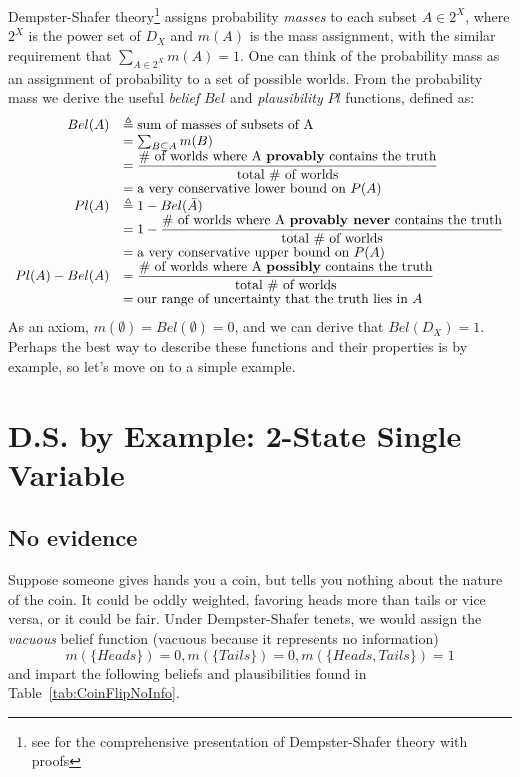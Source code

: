 \documentclass[letterpaper]{article}
\begin{document}
Dempster-Shafer theory\footnote{see \cite{Shafer1976} for the comprehensive presentation of Dempster-Shafer theory with proofs} assigns probability \textit{masses} to each subset $A \in 2^X$, where $2^X$ is the power set of $D_X$ and $m(A)$ is the mass assignment, with the similar requirement that $\sum_{A \in 2^{X}}m(A) = 1$.  One can think of the probability mass as an assignment of probability to a set of possible worlds.  
From the probability mass we derive the useful \textit{belief} $Bel$ and \textit{plausibility} $Pl$ functions, defined as:
\[
\begin{array}{rl}
Bel(A) & \triangleq \text{sum of masses of subsets of A}\\
	& = \sum_{B \subseteq A} m(B) \\
	& = \dfrac{\text{\# of worlds where A \textbf{provably} contains the truth}}{\text{total \# of worlds}}\\
	& = \text{a very conservative lower bound on } P(A)\\
Pl(A) & \triangleq 1-Bel(\bar{A})\\
	& = 1-\dfrac{\text{\# of worlds where A \textbf{provably never} contains the truth}}{\text{total \# of worlds}}\\
	& = \text{a very conservative upper bound on } P(A)\\
Pl(A)-Bel(A) & = \dfrac{\text{\# of worlds where A \textbf{possibly} contains the truth}}{\text{total \# of worlds}}\\
	& = \text{our range of uncertainty that the truth lies in } A
\end{array}
\]
As an axiom, $m(\emptyset)=Bel(\emptyset)=0$, and we can derive that $Bel(D_X)=1$.  Perhaps the best way to describe these functions and their properties is by example, so let's move on to a simple example.

\section{D.S. by Example: 2-State Single Variable}
\subsection{No evidence}
Suppose someone gives hands you a coin, but tells you nothing about the nature of the coin.  It could be oddly weighted, favoring heads more than tails or vice versa, or it could be fair.  Under Dempster-Shafer tenets, we would assign the \textit{vacuous} belief function (vacuous because it represents no information)
\[ m(\{Heads\}) = 0, m(\{Tails\}) = 0, m(\{Heads,Tails\})=1 \]
and impart the following beliefs and plausibilities found in Table~\ref{tab:CoinFlipNoInfo}.
\end{document}

